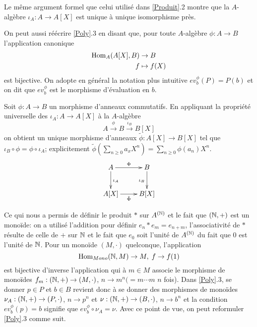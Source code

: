 \begin{remarque}Le même argument  formel que celui utilisé dans \ref{Produit}.2 montre que la $A$-algèbre $\iota_A:A\rightarrow A[X]$ est unique à unique isomorphisme  près.\end{remarque}

	\begin{remarque}On peut aussi réécrire \ref{Poly}.3 en disant que, pour toute $A$-algèbre $\phi:A\rightarrow B$  l'application canonique
		\begin{align*} \operatorname{Hom}_A(A[X],B) &\to B \\ f &\mapsto f(X)\end{align*}
	est bijective. On adopte en général la notation plus intuitive $ev_{b}^\phi(P)=P( b)$ et on dit que $ev_{b}^\phi$ est le morphisme d'évaluation en $b$.\end{remarque}

 Soit $\phi:A  \rightarrow B $ un morphisme  d'anneaux commutatifs. En appliquant la propriété universelle des $\iota_A:A\rightarrow A[X]$  à la $A$-algèbre
$$A\overset{\phi}{\to} B\overset{\iota_B}{\to}B[X]$$
on obtient un unique morphisme d'anneaux  $\tilde{\phi}:A[X]\rightarrow B[X]$ tel que $\iota_B\circ \phi=\phi\circ \iota_A$; explicitement $\tilde{\phi}(\sum_{n\geq 0}a_xX^n)=\sum_{n\geq 0}\phi(a_n)X^n$.\\

	$$ \xymatrix{ A\ar[r]^\Phi \ar[d]^{\iota_A} & B \ar[d]_{\iota_B} \\ A[X]\ar[r]_{\tilde{\Phi}} & B[X] } $$


   \begin{remarque}\label{RemarqueConstr} Ce qui nous a permis de définir le produit $*$ sur $A^{(\mathbb{N})}$ et le fait que $(\mathbb{N},+)$ est un monoïde: on a utilisé l'addition pour définir $e_n*e_m=e_{n+m}$, l'associativité de $*$ résulte de celle de $+$ sur $\mathbb{N}$ et le fait que $e_0$ soit l'unité de $A^{(\mathbb{N})}$ du fait que $0$ est l'unité de $\mathbb{N}$.  Pour un monoïde $(M,\cdot)$ quelconque, l'application
 $$\operatorname{Hom}_{Mono}(\mathbb{N},M)\rightarrow M,\; f\rightarrow f(1)$$
   est bijective d'inverse l'application qui à $m\in M$ associe le morphisme de monoïdes $f_m:(\mathbb{N},+)\rightarrow (M,\cdot)$, $n\rightarrow m^n(=m\cdots m$ $n$ fois). Dans \ref{Poly}.3, se donner $p\in P$ et $b\in B$ revient donc à se donner des morphismes de monoïdes $\nu_A:(\mathbb{N},+)\rightarrow (P,\cdot)$, $n\rightarrow p^n$ et $\nu:(\mathbb{N},+)\rightarrow (B,\cdot)$, $n\rightarrow b^n$ et la condition $ev^\phi_b(p)=b$ signifie que $ev^\phi_b\circ \nu_A=\nu$. Avec ce point de vue, on peut reformuler \ref{Poly}.3 comme suit. \end{remarque}

